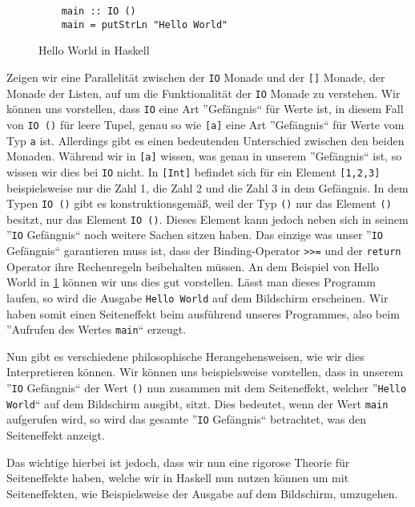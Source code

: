 \documentclass{hhuarticle}
\theoremstyle{definition}
\theoremstyle{theorem}
\begin{document}
  \begin{figure}[h]
    \begin{verbatim}
    main :: IO ()
    main = putStrLn "Hello World"
    \end{verbatim}
    \caption{Hello World in Haskell}%
    \label{fig:helloworld}
  \end{figure}

  Zeigen wir eine Parallelität zwischen der \verb|IO| Monade und der
  \verb|[]| Monade, der Monade der Listen, auf um die Funktionalität
  der \verb|IO| Monade zu verstehen. Wir können uns vorstellen, dass
  \verb|IO| eine Art ''Gefängnis`` für Werte ist, in diesem Fall 
  von \verb|IO ()| für leere Tupel, genau so wie \verb|[a]| eine Art
  ''Gefängnis`` für Werte vom Typ \verb|a| ist. Allerdings gibt es einen
  bedeutenden Unterschied zwischen den beiden Monaden. Während wir
  in \verb|[a]| wissen, was genau in unserem ''Gefängnis`` ist, so
  wissen wir dies bei \verb|IO| nicht. In \verb|[Int]| befindet sich
  für ein Element \verb|[1,2,3]| beispielsweise nur die Zahl 1, die Zahl
  2 und die Zahl 3 in dem Gefängnis. In dem Typen \verb|IO ()|
  gibt es konstruktionsgemäß, weil der Typ \verb|()| nur das Element \verb|()|
  besitzt, nur das Element \verb|IO ()|. Dieses Element kann jedoch
  neben sich in seinem ''\verb|IO| Gefängnis`` noch weitere Sachen sitzen haben.
  Das einzige was unser ''\verb|IO| Gefängnis`` garantieren muss ist, dass
  der Binding-Operator \verb|>>=| und der \verb|return| Operator
  ihre Rechenregeln beibehalten müssen. An dem Beispiel von Hello World
  in \cref{fig:helloworld} können wir uns dies gut vorstellen. Lässt man
  dieses Programm laufen, so wird die Ausgabe \verb|Hello World| auf
  dem Bildschirm erscheinen. Wir haben somit einen Seiteneffekt beim
  ausführend unseres Programmes, also beim ''Aufrufen des Wertes \verb|main|`` erzeugt.

  Nun gibt es verschiedene philosophische Herangehensweisen, wie wir
  dies Interpretieren können. Wir können uns beispielsweise vorstellen,
  dass in unserem ''\verb|IO| Gefängnis`` der Wert \verb|()| nun zusammen mit
  dem Seiteneffekt, welcher ''\verb|Hello World|`` auf dem
  Bildschirm ausgibt, sitzt.
  Dies bedeutet, wenn der Wert \verb|main| aufgerufen wird, so wird
  das gesamte ''\verb|IO| Gefängnis`` betrachtet, was den Seiteneffekt
  anzeigt.

  Das wichtige hierbei ist jedoch, dass wir nun eine rigorose Theorie
  für Seiteneffekte haben, welche wir in Haskell nun nutzen können
  um mit Seiteneffekten, wie Beispielsweise der Ausgabe auf dem Bildschirm,
  umzugehen.
\end{document}
